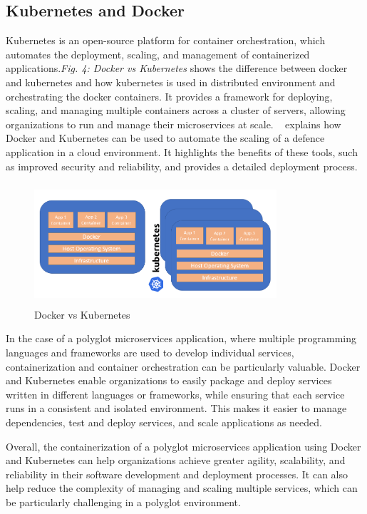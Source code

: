 \subsection{Kubernetes and Docker}
Kubernetes is an open-source platform for container orchestration, which automates the deployment, scaling, and management of containerized applications.\emph{Fig. 4: Docker vs Kubernetes} shows the difference between docker and kubernetes and how kubernetes is used in distributed environment and orchestrating the docker containers. It provides a framework for deploying, scaling, and managing multiple containers across a cluster of servers, allowing organizations to run and manage their microservices at scale.
~\cite{kho2018auto} explains how Docker and Kubernetes can be used to automate the scaling of a defence application in a cloud environment. It highlights the benefits of these tools, such as improved security and reliability, and provides a detailed deployment process.

\begin{figure}
\centering
\includegraphics[width=9cm, height=4.5cm]{docker-vs-kubernetes}
\caption{Docker vs Kubernetes}
\end{figure}

In the case of a polyglot microservices application, where multiple programming languages and frameworks are used to develop individual services, containerization and container orchestration can be particularly valuable. Docker and Kubernetes enable organizations to easily package and deploy services written in different languages or frameworks, while ensuring that each service runs in a consistent and isolated environment. This makes it easier to manage dependencies, test and deploy services, and scale applications as needed.

Overall, the containerization of a polyglot microservices application using Docker and Kubernetes can help organizations achieve greater agility, scalability, and reliability in their software development and deployment processes. It can also help reduce the complexity of managing and scaling multiple services, which can be particularly challenging in a polyglot environment.
